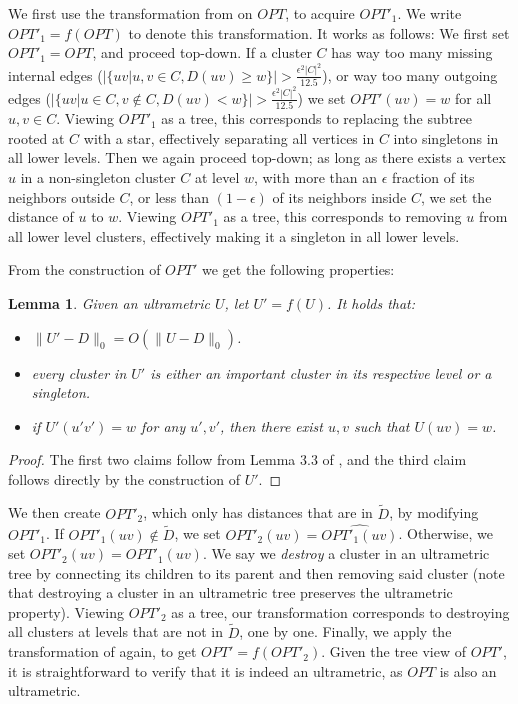 \documentclass{article}
\newtheorem{lemma}[theorem]{Lemma}
\newcommand{\set}[1]{\{#1\}}
\begin{document}
We first use the transformation from \cite{cohen2022fitting} on $OPT$, to acquire $OPT'_1$.
We write $OPT'_1 = f(OPT)$ to denote this transformation.
It works as follows:
We first set $OPT'_1 = OPT$, and proceed top-down.
If a cluster $C$ has way too many missing internal edges ($|\set{uv | u,v \in C, D(uv) \ge w}| > \frac{\epsilon^2 |C|^2}{12.5}$), or way too many outgoing edges ($|\set{uv | u \in C, v \not \in C, D(uv) < w}| > \frac{\epsilon^2 |C|^2}{12.5}$) we set $OPT'(uv)=w$ for all $u,v\in C$.
Viewing $OPT'_1$ as a tree, this corresponds to replacing the subtree rooted at $C$ with a star, effectively separating all vertices in $C$ into singletons in all lower levels.
Then we again proceed top-down; as long as there exists a vertex $u$ in a non-singleton cluster $C$ at level $w$, with more than an $\epsilon$ fraction of its neighbors outside $C$, or less than $(1-\epsilon)$ of its neighbors inside $C$, we set the distance of $u$ to $w$.
Viewing $OPT'_1$ as a tree, this corresponds to removing $u$ from all lower level clusters, effectively making it a singleton in all lower levels.

From the construction of $OPT'$ we get the following properties:

\begin{lemma} \label{lem:transformationVincent}
Given an ultrametric $U$, let $U' = f(U)$.
It holds that:
\begin{itemize}
    \item $\|U'-D\|_0 = O(\|U-D\|_0)$.
    \item every cluster in $U'$ is either an important cluster in its respective level or a singleton.
    \item if $U'(u'v') = w$ for any $u',v'$, then there exist $u,v$ such that $U(uv) = w$.
\end{itemize} 
\end{lemma}
\begin{proof}
The first two claims follow from Lemma $3.3$ of \cite{cohen2022fitting}, and the third claim follows directly by the construction of $U'$.
\end{proof}

We then create $OPT'_2$, which only has distances that are in $\widetilde{D}$, by modifying $OPT'_1$.
If $OPT'_1(uv)\not\in \widetilde{D}$, we set $OPT'_2(uv) = \widehat{OPT'_1(uv)}$.
Otherwise, we set $OPT'_2(uv) = OPT'_1(uv)$.
We say we \emph{destroy} a cluster in an ultrametric tree by connecting its children to its parent and then removing said cluster (note that destroying a cluster in an ultrametric tree preserves the ultrametric property).
Viewing $OPT'_2$ as a tree, our transformation corresponds to destroying all clusters at levels that are not in $\widetilde{D}$, one by one.
Finally, we apply the transformation of  again, to get $OPT' = f(OPT'_2)$.
Given the tree view of $OPT'$, it is straightforward to verify that it is indeed an ultrametric, as $OPT$ is also an ultrametric.
\end{document}
